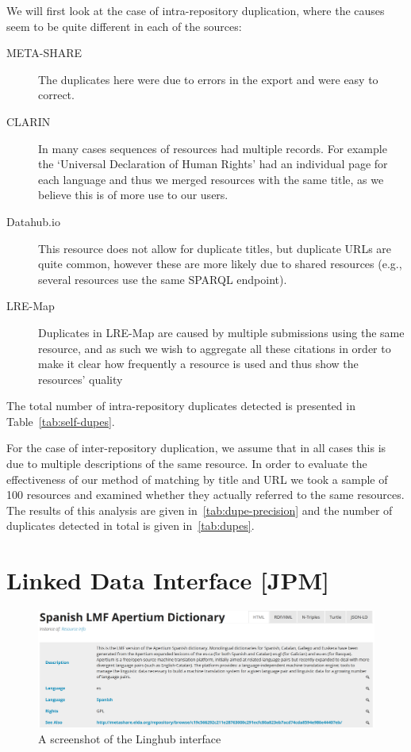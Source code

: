 \documentclass[smallextended]{svjour3}       %
\begin{document}
We will first look at the case of intra-repository duplication, where the causes
seem to be quite different in each of the sources:

\begin{description}
    \item[META-SHARE] The duplicates here were due to errors in the export and
        were easy to correct.
    \item[CLARIN] In many cases sequences of resources had multiple records. For
        example the `Universal Declaration of Human Rights' had an individual
        page for each language and thus we merged resources with the same title,
        as we believe this is of more use to our users.
    \item[Datahub.io] This resource does not allow for duplicate titles, but
        duplicate URLs are quite common, however these are more likely due to
        shared resources (e.g., several resources use the same SPARQL endpoint).
    \item[LRE-Map] Duplicates in LRE-Map are caused by multiple submissions
        using the same resource, and as such we wish to aggregate all these
        citations in order to make it clear how frequently a resource is used
        and thus show the resources' quality
\end{description}

The total number of intra-repository duplicates detected is presented in Table~\ref{tab:self-dupes}.

For the case of inter-repository duplication, we assume that in all cases this
is due to multiple descriptions of the same resource. In order to evaluate the
effectiveness of our method of matching by title and URL we took a sample of 100
resources and examined whether they actually referred to the same resources. The
results of this analysis are given in~\ref{tab:dupe-precision} and the number of
duplicates detected in total is given in~\ref{tab:dupes}.


\section{Linked Data Interface [JPM]}
\label{linked-data-interface}


\begin{figure}
\includegraphics[width=\textwidth]{linghub-screenshot.png}
\caption{A screenshot of the Linghub interface\label{fig:screenshot}}
\end{figure}
\end{document}
